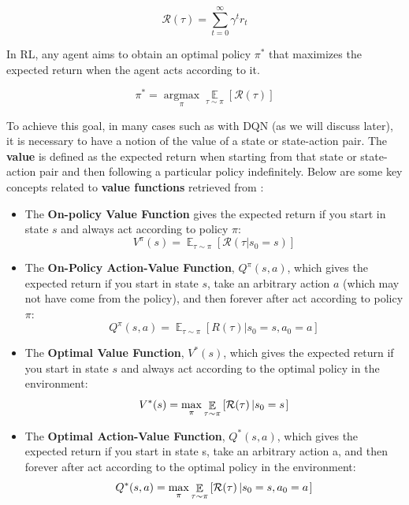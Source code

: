 $$\mathcal{R}(\tau) = \sum_{t=0}^\infty \gamma^t r_t$$

In RL, any agent aims to obtain an optimal policy $\pi^\ast$ that maximizes the expected return when the agent acts according to it.

\begin{equation}
    \pi^\ast = \operatorname*{arg max}_\pi \mathop{\mathbb{E}}\limits_{\tau \sim \pi}\left[\mathcal{R}(\tau) \right]
\label{eq:rl_objective}
\end{equation}

To achieve this goal, in many cases such as with DQN (as we will discuss later), it is necessary to have a notion of the value of a state or state-action pair. The \textbf{value} is defined as the expected return when starting from that state or state-action pair and then following a particular policy indefinitely. Below are some key concepts related to \textbf{value functions} retrieved from \cite{SpinningUp2018}:

\begin{itemize}
    \item The \textbf{On-policy Value Function} gives the expected return if you start in state $s$ and always act according to policy $\pi$:
    \begin{equation}
    V^\pi(s) = \mathop{\mathbb E}_{\tau \sim \pi} \left[\mathcal{R}(\tau | s_0 = s)\right]
    \end{equation}
    \item The \textbf{On-Policy Action-Value Function}, $Q^{\pi}(s,a)$, which gives the expected return if you start in state $s$, take an arbitrary action $a$ (which may not have come from the policy), and then forever after act according to policy $\pi$:
    \begin{equation}
    Q^{\pi}(s,a) = \mathop{\mathbb E}_{\tau \sim \pi}\left[R(\tau)\left| s_0 = s, a_0 = a\right.\right]
    \end{equation}
    \item The \textbf{Optimal Value Function}, $V^*(s)$, which gives the expected return if you start in state $s$ and always act according to the optimal policy in the environment:
    \begin{equation}
    V^*(s) = \max_{\pi} \mathop{\mathbb{E}}\limits_{\tau \sim \pi}\left[\mathcal{R}(\tau)\left| s_0 = s\right.\right]
    \end{equation}
    \item The \textbf{Optimal Action-Value Function}, $Q^*(s,a)$, which gives the expected return if you start in state s, take an arbitrary action a, and then forever after act according to the optimal policy in the environment:
    \begin{equation}
        Q^*(s,a) = \max_{\pi} \mathop{\mathbb{E}}\limits_{\tau \sim \pi}\left[\mathcal{R}(\tau)\left| s_0 = s, a_0 = a\right.\right]
        \label{eq:q_optimal_value}
    \end{equation}


\end{itemize}

